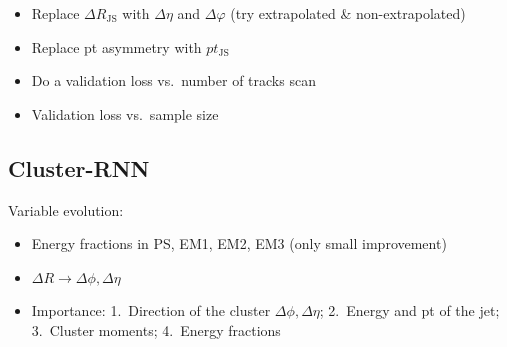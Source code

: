 \begin{itemize}
\item Replace $\Delta R_\mathrm{JS}$ with $\Delta \eta$ and $\Delta \varphi$
  (try extrapolated \& non-extrapolated)
\item Replace pt asymmetry with $pt_\mathrm{JS}$
\item Do a validation loss vs.\ number of tracks scan
\item Validation loss vs.\ sample size
\end{itemize}

\subsection{Cluster-RNN}
\label{sec:rnn_clusters}

Variable evolution:
\begin{itemize}
\item Energy fractions in PS, EM1, EM2, EM3 (only small improvement)
\item $\Delta R \rightarrow \Delta \phi, \Delta \eta$
\item Importance: 1.\ Direction of the cluster $\Delta \phi, \Delta \eta$; 2.\
  Energy and pt of the jet; 3.\ Cluster moments; 4.\ Energy fractions
\end{itemize}

